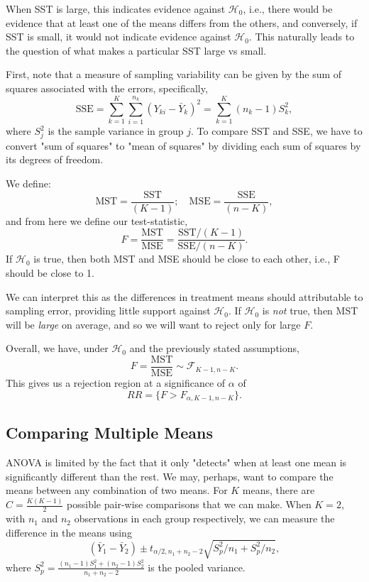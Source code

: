 \documentclass[12pt]{article}
\begin{document}
When SST is large, this indicates evidence against $\mathcal{H}_0$, i.e., there would be evidence that at least one of the means differs from the others, and conversely, if SST is small, it would not indicate evidence against $\mathcal{H}_0$. This naturally leads to the question of what makes a particular SST large vs small.

First, note that a measure of sampling variability can be given by the sum of squares associated with the errors, specifically, \[\text{SSE} = \sum_{k=1}^K \sum_{i=1}^{n_k}(Y_{ki} - \bar{Y}_k)^2 = \sum_{k=1}^K(n_k-1)S_k^2,\] where $S_j^2$ is the sample variance in group $j$. To compare SST and SSE, we have to convert "sum of squares" to "mean of squares" by dividing each sum of squares by its degrees of freedom.

We define:
\[\text{MST} = \frac{\text{SST}}{(K-1)}; \quad \text{MSE} = \frac{\text{SSE}}{(n-K)},\] and from here we define our test-statistic, \[F = \frac{\text{MST}}{\text{MSE}} = \frac{\text{SST}/(K-1)}{\text{SSE}/(n-K)}.\] If $\mathcal{H}_0$ is true, then both MST and MSE should be close to each other, i.e., F should be close to 1.

We can interpret this as the differences in treatment means should attributable to sampling error, providing little support against $\mathcal{H}_0$. If $\mathcal{H}_0$ is \textit{not} true, then MST will be \textit{large} on average, and so we will want to reject only for large $F$.

Overall, we have, under $\mathcal{H}_0$ and the previously stated assumptions, \[F = \frac{\text{MST}}{\text{MSE}} \sim \mathcal{F}_{K-1, n-K}.\] This gives us a rejection region at a significance of $\alpha$ of \[RR = \{F > F_{\alpha, K-1, n-K}\}.\]

\subsection{Comparing Multiple Means}

ANOVA is limited by the fact that it only "detects" when at least one mean is significantly different than the rest. We may, perhaps, want to compare the means between any combination of two means. For $K$ means, there are $C = \frac{K(K-1)}{2}$ possible pair-wise comparisons that we can make. When $K = 2$, with $n_1$ and $n_2$ observations in each group respectively, we can measure the difference in the means using \[(\bar{Y}_1 - \bar{Y}_2) \pm t_{\alpha/2, n_1+n_2 - 2}\sqrt{S^2_p/n_1 + S^2_p/n_2},\] where $S_p^2 = \frac{(n_1-1)S_1^2 + (n_2-1)S_2^2}{n_1+n_2-2}$ is the pooled variance.
\end{document}
